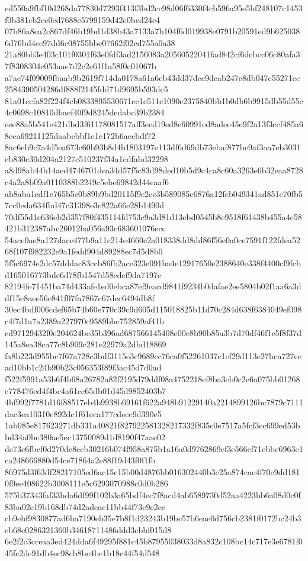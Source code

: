 \documentclass[11pt,a4paper]{article}
\begin{document}
{ed550a9fbf10d268da77830d7293f413f3bd2cc98d06f6330f4cb596a95e5bf248107c1453f0b381cb2ce0ed7688e5799159d42e0bed24c4
07b86a8ea2c867df46b19bd1d38b43a7133a7b104f6d019938e0791b20591ed9b6250386d76bd4ce97dd6c08755bbe07662f02cd755a0a38
21a80bb3e403c101f0301f63e0fdf3ad2156083a20560522041fad842cf6dcbcc06c80afa37f8308304c053aae7d2c2e61f1a58f0c01067b
a7ae74f09009fbaab9b2619f714da0178a61a6eb43dd37dec9deab247e8db047c55271ec2584390504286df888f2145fdd71d9695b593dc5
81a01ccfa82f224f4cb0833895530671ce1c511c1090c2375840bb1b0db6b9915db55d55c4c0698c10810dbaef40f9d8245dedabc39b2384
eee88a5b541e421dbd3f61178081517aff3eed19ed8e60991ed8adee45e9f2a13f3ccf485a68cea69211125daabcbbf1e1e172b6aecbdf72
8ac6eb9c7a4d5ea673c60b93b8d4b1803197e113df6d69db73ebaf877be9af3aa7eb3031eb830c30d204a2127c510237f34a1cdfabd32298
a8d98ab44b14aed4746701dea34d57f5c83d98ded10b5d9c4ca8c60a3263e6b32eaa8728c4a2a8b09a0110388b2249c5ebe69842d44eaaf6
ab8aba1edf1e765b5e0b89b9bd20115f9c2ec3b589085e6876a12fcb049341ad851c70fb57cc0eda634fbd47c31398e3e822a66e28b1490d
70df55d1e636eb2d357f80f435114fd753c9a3d81d13ebd0545b8e9518f61438b455a4c58421b312387abc26012ba056a93c683601076ecc
54ace0ae8a127dace477b9a11c214e4660e2a018338dd8dd86f56e0a0ce7591f122fdea5268f107f982232e9a1fedd904d89288ec7d5d8b0
5f5c6974e2dc57dddac83ccb86fb2ace323e091ba4e12917650e2388640e338f4400cf9fcbd165016773bde6d78fb1547d58cdef9da7197c
82194fe71451ba74d433afe1ed0ebca87ef9eacd9841f9234b0dafae2ee5804b02f1aa6a3ddf15c8aee56e841f07fa7867c67dec6494db8f
30ec4bdf006cdef65b74b60e770c39c9d605d115018825b11d70c284d638f6384049ef098c4f7d1a7a2389a227970c9589bbc752859af41b
cd97129432f0e204624be35b396ad687566145408e00e8b90b85a3b7d70df46f1c5f8f37d145a8ea38ca77c8b909c281e22979a2dbd18869
fa8b223d955bc7f67a728c3bdf3115e3c9689cc76ca0f52261037c1ef29d113e27bca727cead10bb1c24b90b23c056353f89f3ac45d7d0ad
f522f5991a53b6f4b68a26782a82f2195d79ddf08a4752218ef8ba3eb0c2e6a075bb01268e778476ed4f4bc4a61cc65db01d45d9852403b7
4bf992f7781d16f88517eb4b9938b69161f622a948b91229140a2214899126bc7879c7111dac3ea10310e892dc1f61eca177cdecc9d390e5
1ab085e817623271db331a40821f827922581328217332f835c0e7517a5fcf3ec699ed53bbd34a0bc380ae5ec13750089d1d8190f47aae02
de73c6fbcf0d270de8ccb30216b074f958a875b1a16a0d9762869ef3e566cf71ebbe6963e1ca248666880d54ce71864a2e88f19d43f0f1fb
86975d3f63df28217105ed6ac15c15b00d4876bb016302440b3c25a874cae4f70e9dd1810f9ee408622b3008111e5c6293070988c0d0b286
575b37343faf33bda6df99f102b3a65bdf4ec7f8acd4ab6589730d52aa4223bb6a08d0c0f83ba02e19b168db74d2adeac11bb44f73c9c2ee
cb9ebf9830877ad6ba7190eb35e7b8f1d23243b19bc57b6eae0d756cb2381f0172bc24b3eb68e0286321360b34618711486ddd3cbbf015d8
6e2f2c3cceaa3ed424dda6f49295f881c45b87955038033d8a832c108bc14c717e3e6781f045fc2de91db4ec98cb8bc4be1b18c44f54d548
}
\end{document}
